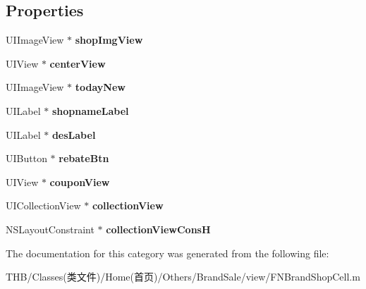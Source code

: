 \subsection*{Properties}
\begin{DoxyCompactItemize}
\item 
\mbox{\label{category_f_n_brand_shop_cell_07_08_a4b50cdbcac81d4efca3cb221efee8cdf}} 
U\+I\+Image\+View $\ast$ {\bfseries shop\+Img\+View}
\item 
\mbox{\label{category_f_n_brand_shop_cell_07_08_a89082e8f0b7c098f18c05e6ade77c981}} 
U\+I\+View $\ast$ {\bfseries center\+View}
\item 
\mbox{\label{category_f_n_brand_shop_cell_07_08_af615b12b306d4c4604a00b1c2fb5d857}} 
U\+I\+Image\+View $\ast$ {\bfseries today\+New}
\item 
\mbox{\label{category_f_n_brand_shop_cell_07_08_ac00e18e3842ff5834297625b4b6cfc0c}} 
U\+I\+Label $\ast$ {\bfseries shopname\+Label}
\item 
\mbox{\label{category_f_n_brand_shop_cell_07_08_a33e3dc954eaa6c3095c95135562368c3}} 
U\+I\+Label $\ast$ {\bfseries des\+Label}
\item 
\mbox{\label{category_f_n_brand_shop_cell_07_08_a71b267c8fd8952eb0f14443d9f5d2cf0}} 
U\+I\+Button $\ast$ {\bfseries rebate\+Btn}
\item 
\mbox{\label{category_f_n_brand_shop_cell_07_08_ac2924bfd70a3c0ee7f6f93c9a2c0f207}} 
U\+I\+View $\ast$ {\bfseries coupon\+View}
\item 
\mbox{\label{category_f_n_brand_shop_cell_07_08_afbdcac162cea7ca166faf49ec9fecca4}} 
U\+I\+Collection\+View $\ast$ {\bfseries collection\+View}
\item 
\mbox{\label{category_f_n_brand_shop_cell_07_08_ab161d3b5882e8f73847f677be368f49b}} 
N\+S\+Layout\+Constraint $\ast$ {\bfseries collection\+View\+ConsH}
\end{DoxyCompactItemize}


The documentation for this category was generated from the following file\+:\begin{DoxyCompactItemize}
\item 
T\+H\+B/\+Classes(类文件)/\+Home(首页)/\+Others/\+Brand\+Sale/view/F\+N\+Brand\+Shop\+Cell.\+m\end{DoxyCompactItemize}
